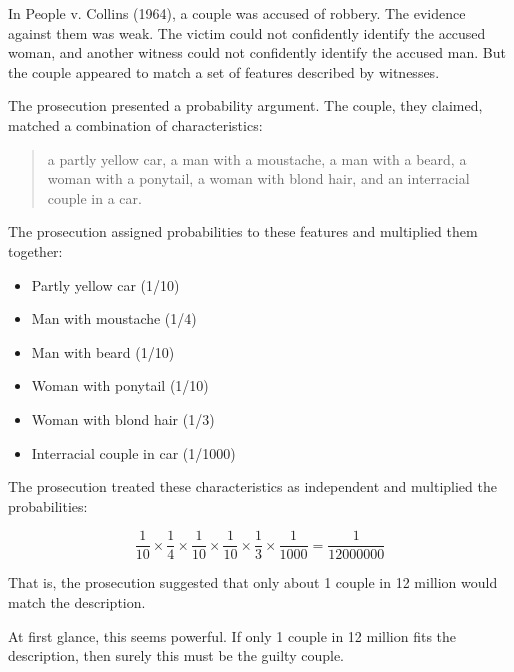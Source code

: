 \documentclass[
  letterpaper,
  DIV=11,
  numbers=noendperiod]{scrreprt}
\providecommand{\tightlist}{%
  \setlength{\itemsep}{0pt}\setlength{\parskip}{0pt}}
\begin{document}
\begin{tcolorbox}[enhanced jigsaw, arc=.35mm, bottomrule=.15mm, bottomtitle=1mm, breakable, colback=white, colbacktitle=quarto-callout-note-color!10!white, colframe=quarto-callout-note-color-frame, coltitle=black, left=2mm, leftrule=.75mm, opacityback=0, opacitybacktitle=0.6, rightrule=.15mm, title=\textcolor{quarto-callout-note-color}{\faInfo}\hspace{0.5em}{Case Study: People v Collins}, titlerule=0mm, toprule=.15mm, toptitle=1mm]

In People v. Collins (1964), a couple was accused of robbery. The
evidence against them was weak. The victim could not confidently
identify the accused woman, and another witness could not confidently
identify the accused man. But the couple appeared to match a set of
features described by witnesses.

The prosecution presented a probability argument. The couple, they
claimed, matched a combination of characteristics:

\begin{quote}
a partly yellow car, a man with a moustache, a man with a beard, a woman
with a ponytail, a woman with blond hair, and an interracial couple in a
car.
\end{quote}

The prosecution assigned probabilities to these features and multiplied
them together:

\begin{itemize}
\tightlist
\item
  Partly yellow car (1/10)
\item
  Man with moustache (1/4)
\item
  Man with beard (1/10)
\item
  Woman with ponytail (1/10)
\item
  Woman with blond hair (1/3)
\item
  Interracial couple in car (1/1000)
\end{itemize}

The prosecution treated these characteristics as independent and
multiplied the probabilities:

\[\frac{1}{10}
\times
\frac{1}{4}
\times
\frac{1}{10}
\times
\frac{1}{10}
\times
\frac{1}{3}
\times
\frac{1}{1000} = \frac{1}{12000000}\]

That is, the prosecution suggested that only about 1 couple in 12
million would match the description.

At first glance, this seems powerful. If only 1 couple in 12 million
fits the description, then surely this must be the guilty couple.


\end{tcolorbox}
\end{document}
